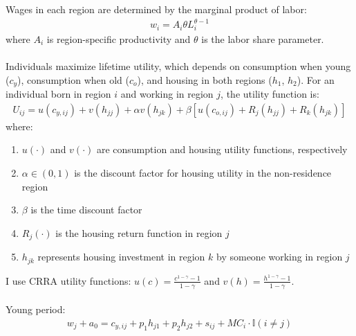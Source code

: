 \documentclass[12pt,letterpaper]{article}
\begin{document}
	Wages in each region are determined by the marginal product of labor:
	\begin{align*}
		w_i = A_i \theta L_i^{\theta-1}
	\end{align*}
	where $A_i$ is region-specific productivity and $\theta$ is the labor share parameter.\smallskip\\
	\smallskip\\
	Individuals maximize lifetime utility, which depends on consumption when young ($c_y$), consumption when old ($c_o$), and housing in both regions ($h_1$, $h_2$). For an individual born in region $i$ and working in region $j$, the utility function is:
	\begin{align*}
		U_{ij} = u(c_{y,ij}) + v(h_{jj}) + \alpha v(h_{jk}) + \beta[u(c_{o,ij}) + R_j(h_{jj}) + R_k(h_{jk})]
	\end{align*}
	where:
	\begin{enumerate}
		\item $u(\cdot)$ and $v(\cdot)$ are consumption and housing utility functions, respectively
		\item $\alpha \in (0,1)$ is the discount factor for housing utility in the non-residence region
		\item $\beta$ is the time discount factor
		\item $R_j(\cdot)$ is the housing return function in region $j$
		\item $h_{jk}$ represents housing investment in region $k$ by someone working in region $j$
	\end{enumerate}
	
	I use CRRA utility functions: $u(c) = \frac{c^{1-\gamma}-1}{1-\gamma}$ and $v(h) = \frac{h^{1-\gamma}-1}{1-\gamma}$.\smallskip\\
	\smallskip\\
	Young period:
	\begin{align*}
		w_j + a_0 = c_{y,ij} + p_1 h_{j1} + p_2 h_{j2} + s_{ij} + MC_i \cdot \mathbb{I}(i \neq j)
	\end{align*}
	
\end{document}
